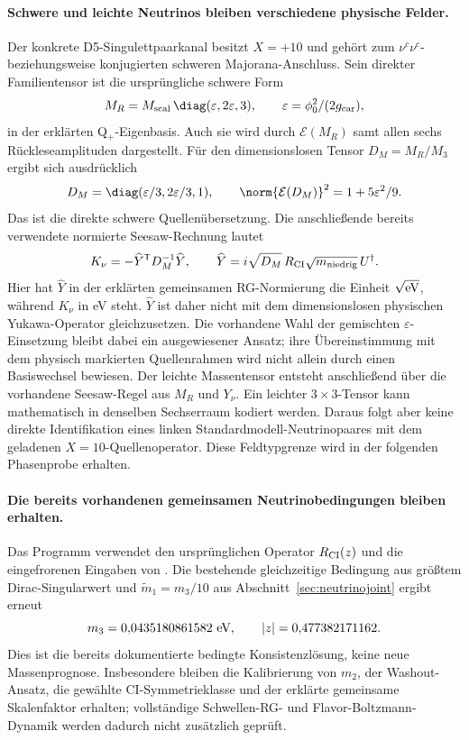\paragraph{Schwere und leichte Neutrinos bleiben verschiedene physische Felder.}
Der konkrete D5-Singulettpaarkanal besitzt $X=+10$ und gehört zum
$\nu^c\nu^c$- beziehungsweise konjugierten schweren Majorana-Anschluss.
Sein direkter Familientensor ist die ursprüngliche schwere Form
\[
 M_R=M_{\rm scal}\,\diag(\varepsilon,2\varepsilon,3),
 \qquad \varepsilon=\phi_0^2/(2g_{\rm car}),
\]
in der erklärten Q$_+$-Eigenbasis. Auch sie wird durch
$\mathcal E(M_R)$ samt allen sechs Rückleseamplituden dargestellt.
Für den dimensionslosen Tensor $D_M=M_R/M_3$ ergibt sich ausdrücklich
\[
 D_M=\diag(\varepsilon/3,2\varepsilon/3,1),\qquad
 \norm{\mathcal E(D_M)}^2=1+5\varepsilon^2/9.
\]
Das ist die direkte schwere Quellenübersetzung. Die anschließende bereits
verwendete normierte Seesaw-Rechnung lautet
\[
 K_\nu=-\widehat Y^{\mathsf T}D_M^{-1}\widehat Y,\qquad
 \widehat Y=i\sqrt{D_M}\,R_{\rm CI}\sqrt{m_{\rm niedrig}}\,U^\dagger.
\]
Hier hat $\widehat Y$ in der erklärten gemeinsamen RG-Normierung die Einheit
$\sqrt{\rm eV}$, während $K_\nu$ in eV steht. $\widehat Y$ ist daher nicht
mit dem dimensionslosen physischen Yukawa-Operator gleichzusetzen.
Die vorhandene Wahl der gemischten $\varepsilon$-Einsetzung bleibt dabei
ein ausgewiesener Ansatz; ihre Übereinstimmung mit dem physisch markierten
Quellenrahmen wird nicht allein durch einen Basiswechsel bewiesen.
Der leichte Massentensor entsteht anschließend über die vorhandene
Seesaw-Regel aus $M_R$ und $Y_\nu$.
Ein leichter $3\times3$-Tensor kann mathematisch in denselben Sechserraum
kodiert werden. Daraus folgt aber keine direkte Identifikation eines
linken Standardmodell-Neutrinopaares mit dem geladenen $X=10$-Quellenoperator.
Diese Feldtypgrenze wird in der folgenden Phasenprobe erhalten.

\paragraph{Die bereits vorhandenen gemeinsamen Neutrinobedingungen bleiben erhalten.}
Das Programm verwendet den ursprünglichen Operator $R_{\rm CI}(z)$ und
die eingefrorenen Eingaben von .
Die bestehende gleichzeitige Bedingung aus größtem Dirac-Singularwert und
$\widetilde m_1=m_3/10$ aus Abschnitt~\ref{sec:neutrinojoint} ergibt erneut
\[
 m_3=0{,}0435180861582\ {\rm eV},\qquad |z|=0{,}477382171162.
\]
Dies ist die bereits dokumentierte bedingte Konsistenzlösung, keine neue
Massenprognose. Insbesondere bleiben die Kalibrierung von $m_2$, der
Washout-Ansatz, die gewählte CI-Symmetrieklasse und der erklärte gemeinsame
Skalenfaktor erhalten; vollständige Schwellen-RG- und Flavor-Boltzmann-Dynamik
werden dadurch nicht zusätzlich geprüft.

